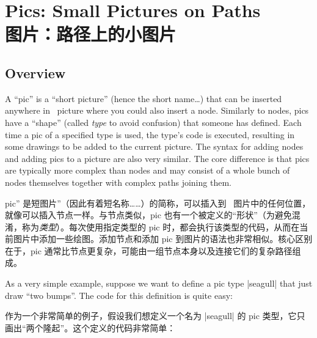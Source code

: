 \setcounter{section}{17}
\setcounter{subsection}{14}
\setcounter{subsubsection}{0}
%
%
%


\section{Pics: Small Pictures on Paths\\图片：路径上的小图片}
\label{section-pics}

\subsection{Overview}

A ``pic'' is a ``short picture'' (hence the short name\dots) that can be
inserted anywhere in \tikzname\ picture where you could also insert a node.
Similarly to nodes, pics have a ``shape'' (called \emph{type} to avoid
confusion) that someone has defined. Each time a pic of a specified type is
used, the type's code is executed, resulting in some drawings to be added to
the current picture. The syntax for adding nodes and adding pics to a picture
are also very similar. The core difference is that pics are typically more
complex than nodes and may consist of a whole bunch of nodes themselves
together with complex paths joining them.

pic'' 是短图片''（因此有着短名称……）的简称，可以插入到 \tikzname\ 图片中的任何位置，就像可以插入节点一样。与节点类似，pic 也有一个被定义的``形状''（为避免混淆，称为\emph{类型}）。每次使用指定类型的 pic 时，都会执行该类型的代码，从而在当前图片中添加一些绘图。添加节点和添加 pic 到图片的语法也非常相似。核心区别在于，pic 通常比节点更复杂，可能由一组节点本身以及连接它们的复杂路径组成。

As a very simple example, suppose we want to define a pic type |seagull| that
just draw ``two bumps''. The code for this definition is quite easy:

作为一个非常简单的例子，假设我们想定义一个名为 |seagull| 的 pic 类型，它只画出``两个隆起''。这个定义的代码非常简单：

%
\begin{codeexample}
\end{codeexample}

